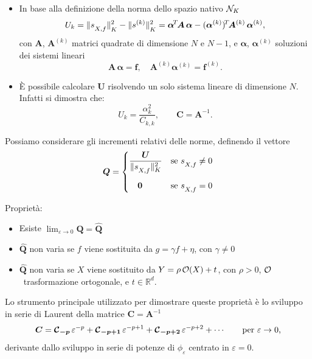 \documentclass[10pt]{beamer}
\theoremstyle{definition}
\theoremstyle{plain}
\def\R{\mathbb R}
\def\Cal#1{{\cal #1}}
\def\norm#1{\Vert #1\Vert}
\def\hbyw#1#2{\vbox to #1{\vfil \hbox to #2{\hfil}}}
\def\lK{{\lower.5ex\hbox{$\scriptstyle K$}}}
\def\lXf{{\lower.5ex\hbox{$\scriptstyle X, f$}}}
\begin{document}
\begin{frame}
\begin{itemize}
\item In base alla definizione della norma dello spazio nativo $\Cal N_K$
$$
U_k = \norm{s_\lXf}^2_\lK - \norm{s^{(k)}}^2_\lK = \bm \alpha^{\!T\!}\bm A\,\bm\alpha - (\bm\alpha^{(k)})^{\!T\!}\bm A^{(k)}\,\bm\alpha^{(k)},
$$
con $\bm A$,  $\bm A^{(k)}$ matrici quadrate di dimensione $N$ e $N-1$, e $\bm\alpha$, $\bm\alpha^{(k)}$ soluzioni dei sistemi lineari
$$
\bm A\,\bm\alpha =\bm f,\quad \bm A^{(k)} \bm\alpha^{(k)} = \bm f^{(k)}.
$$ 


\item
È possibile calcolare $\bm U$ risolvendo un solo sistema lineare di dimensione $N$.  Infatti si dimostra che:
$$
U_k = \frac{\alpha_k^2}{C_{k,k}}, \qquad \bm C = \bm A^{-1}.
$$
\end{itemize}
\end{frame}

\begin{frame}
Possiamo considerare gli incrementi relativi delle norme, definendo il vettore
$$
\bm Q = \begin{cases}\displaystyle
			\frac{\bm U}{\norm{s_\lXf}^2_K} & \text{se $s_\lXf \neq 0$}\\
			\hbyw{4ex}{1em}\bm 0 & \text{se $s_\lXf = 0$}
	       \end{cases}
$$

\alert{Proprietà}:
\begin{itemize}
\item Esiste $\lim_{\varepsilon\to 0} \bm Q = \widehat{\bm Q}$
\item $\widehat{\bm Q}$ non varia se $f$ viene sostituita da $g = \gamma f + \eta$, con $\gamma\neq 0$
\item $\widehat{\bm Q}$ non varia se $X$ viene sostituito da $Y = \rho\, \Cal O(X) + t$, con $\rho>0$,  $\Cal O$~trasformazione ortogonale, e $t\in\R^d$.
\end{itemize}

Lo strumento principale utilizzato per dimostrare queste proprietà è lo sviluppo in serie di Laurent della matrice $\bm C = \bm A^{-1}$
$$
\bm C = \bm{\Cal C}_{\bm{-p}}\,\varepsilon^{-p} + \bm{\Cal C}_{\bm{-p+1}}\,\varepsilon^{-p+1} +  \bm{\Cal C}_{\bm{-p+2}}\,\varepsilon^{-p+2}+\cdots\qquad \text{per $\varepsilon\to0$,}
$$
derivante dallo sviluppo in serie di potenze di $\phi_\varepsilon$ centrato in $\varepsilon = 0$.

\end{frame}
\end{document}

